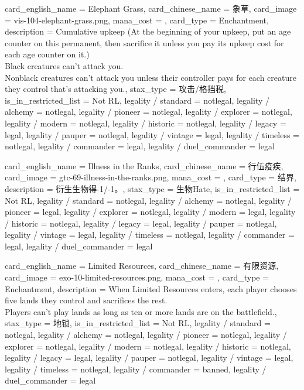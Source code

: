 \documentclass[lang = cn, color = black, 10pt]{AllThatStax}
\begin{document}
\card
{
	card_english_name = {Elephant Grass},
	card_chinese_name = {象草},
	card_image = vis-104-elephant-grass.png,
	mana_cost = ,
	card_type = Enchantment,
	description = {Cumulative upkeep  (At the beginning of your upkeep, put an age counter on this permanent, then sacrifice it unless you pay its upkeep cost for each age counter on it.)\\
		Black creatures can't attack you.\\
		Nonblack creatures can't attack you unless their controller pays  for each creature they control that's attacking you.},
	stax_type = 攻击/格挡税,
	is_in_restricted_list = Not RL,
	legality / standard = notlegal,
	legality / alchemy = notlegal,
	legality / pioneer = notlegal,
	legality / explorer = notlegal,
	legality / modern = notlegal,
	legality / historic = notlegal,
	legality / legacy = legal,
	legality / pauper = notlegal,
	legality / vintage = legal,
	legality / timeless = notlegal,
	legality / commander = legal,
	legality / duel_commander = legal
}

\card
{
	card_english_name = {Illness in the Ranks},
	card_chinese_name = {行伍疫疾},
	card_image = gtc-69-illness-in-the-ranks.png,
	mana_cost = ,
	card_type = 结界,
	description = {衍生生物得-1/-1。},
	stax_type = 生物Hate,
	is_in_restricted_list = Not RL,
	legality / standard = notlegal,
	legality / alchemy = notlegal,
	legality / pioneer = legal,
	legality / explorer = notlegal,
	legality / modern = legal,
	legality / historic = notlegal,
	legality / legacy = legal,
	legality / pauper = notlegal,
	legality / vintage = legal,
	legality / timeless = notlegal,
	legality / commander = legal,
	legality / duel_commander = legal
}

\card
{
	card_english_name = {Limited Resources},
	card_chinese_name = {有限资源},
	card_image = exo-10-limited-resources.png,
	mana_cost = ,
	card_type = Enchantment,
	description = {When Limited Resources enters, each player chooses five lands they control and sacrifices the rest.\\
		Players can't play lands as long as ten or more lands are on the battlefield.},
	stax_type = 地锁,
	is_in_restricted_list = Not RL,
	legality / standard = notlegal,
	legality / alchemy = notlegal,
	legality / pioneer = notlegal,
	legality / explorer = notlegal,
	legality / modern = notlegal,
	legality / historic = notlegal,
	legality / legacy = legal,
	legality / pauper = notlegal,
	legality / vintage = legal,
	legality / timeless = notlegal,
	legality / commander = banned,
	legality / duel_commander = legal
}
\end{document}
